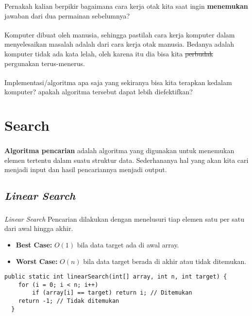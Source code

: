\documentclass{../praktikum-ppt}
\begin{document}
    \begin{frame}
      \begin{masalah}
        Pernakah kalian berpikir bagaimana cara kerja otak kita saat ingin \textbf{menemukan} jawaban dari dua permainan sebelumnya?\\~\\

        Komputer dibuat oleh manusia, sehingga pastilah cara kerja komputer dalam menyelesaikan masalah adalah dari cara kerja otak manusia. Bedanya adalah komputer tidak ada kata lelah, oleh karena itu dia bisa kita \st{perbudak} pergunakan terus-menerus.\\~\\

        Implementasi/algoritma apa saja yang sekiranya bisa kita terapkan kedalam komputer? apakah algoritma tersebut dapat lebih diefektifkan?
      \end{masalah}
    \end{frame}

    \section{Search}
    \begin{frame}
        \frametitle{\insertsection}
        \begin{definisi}
          \textbf{Algoritma pencarian} adalah algoritma yang digunakan untuk menemukan elemen tertentu dalam suatu struktur data. Sederhananya hal yang akan kita cari menjadi \textcolor{HIMAtua}{input} dan hasil pencariannya menjadi \textcolor{HIMAtua}{output}.
        \end{definisi}
    \end{frame}

    \subsection{\textit{Linear Search}}
    \begin{frame}[fragile]
      \frametitle{\insertsection}
      \framesubtitle{\insertsubsection}
      \begin{block}{\textit{Linear Search}}
          Pencarian dilakukan dengan menelusuri tiap elemen satu per satu dari awal hingga akhir.
          \begin{itemize}
              \item \textbf{Best Case:} \(O(1)\) bila data target ada di awal array.
              \item \textbf{Worst Case:} \(O(n)\) bila data target berada di akhir atau tidak ditemukan.
          \end{itemize}
      \end{block}
      
          \begin{lstlisting}[caption={Kode Linear Search}]
  public static int linearSearch(int[] array, int n, int target) {
    for (i = 0; i < n; i++) 
        if (array[i] == target) return i; // Ditemukan
    return -1; // Tidak ditemukan
  }
          \end{lstlisting}
    \end{frame}
\end{document}
